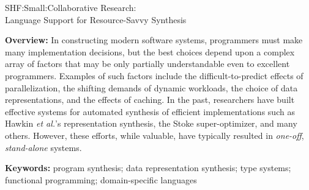 \documentclass[12pt]{article}
\begin{document}
\setcounter{page}{1}

 \begin{large}
\begin{center}
SHF:Small:Collaborative Research: \\
Language Support for Resource-Savvy Synthesis
\end{center}
\end{large}

\noindent
\textbf{Overview:}   
In constructing modern software systems, 
programmers must make many implementation decisions, but
the best choices depend upon a complex array of factors that may be
only partially understandable even to excellent programmers.
Examples of such factors include the difficult-to-predict effects of 
parallelization, the shifting demands of dynamic workloads,  the
choice of data representations, and the effects of caching.
In the past, researchers have built effective systems 
for automated synthesis of efficient
implementations such as Hawkin \emph{et al.}'s representation
synthesis, the Stoke super-optimizer, and many others.
However, these efforts, while valuable, have typically resulted in 
\emph{one-off}, \emph{stand-alone} systems.

\noindent\textbf{Keywords:} program synthesis; data representation synthesis;
type systems; functional programming; domain-specific languages
\end{document}
